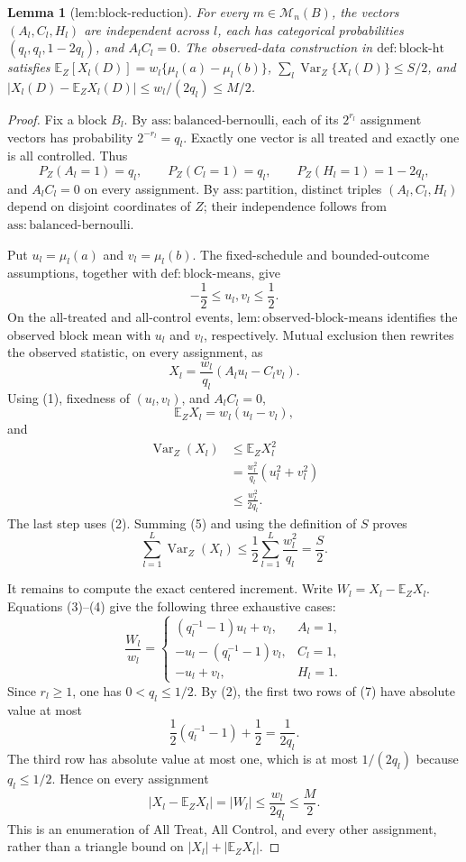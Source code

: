 \documentclass{article}
\newtheorem{lemma}{Lemma}
\begin{document}
\begin{lemma}[lem:block-reduction]\label{lem:block-reduction}
For every \(m\in\mathcal M_n(B)\), the vectors \((A_l,C_l,H_l)\) are independent across \(l\), each has categorical probabilities \((q_l,q_l,1-2q_l)\), and \(A_lC_l=0\). The observed-data construction in \(\mathrm{def{:}block\text{-}ht}\) satisfies \(\mathbb E_Z[X_l(D)]=w_l\{\mu_l(a)-\mu_l(b)\}\), \(\sum_l\operatorname{Var}_Z\{X_l(D)\}\le S/2\), and \(|X_l(D)-\mathbb E_ZX_l(D)|\le w_l/(2q_l)\le M/2\).
\end{lemma}
\begin{proof}
Fix a block \(B_l\). By \(\mathrm{ass{:}balanced\text{-}bernoulli}\), each of its \(2^{r_l}\) assignment vectors has probability \(2^{-r_l}=q_l\). Exactly one vector is all treated and exactly one is all controlled. Thus
\[
 P_Z(A_l=1)=q_l,\qquad P_Z(C_l=1)=q_l,
 \qquad P_Z(H_l=1)=1-2q_l,
\tag{1}
\]
and \(A_lC_l=0\) on every assignment. By \(\mathrm{ass{:}partition}\), distinct triples \((A_l,C_l,H_l)\) depend on disjoint coordinates of \(Z\); their independence follows from \(\mathrm{ass{:}balanced\text{-}bernoulli}\).

Put \(u_l=\mu_l(a)\) and \(v_l=\mu_l(b)\). The fixed-schedule and bounded-outcome assumptions, together with \(\mathrm{def{:}block\text{-}means}\), give
\[
 -\frac12\le u_l,v_l\le\frac12.
\tag{2}
\]
On the all-treated and all-control events, \(\mathrm{lem{:}observed\text{-}block\text{-}means}\) identifies the observed block mean with \(u_l\) and \(v_l\), respectively. Mutual exclusion then rewrites the observed statistic, on every assignment, as
\[
 X_l=\frac{w_l}{q_l}(A_lu_l-C_lv_l).
\tag{3}
\]
Using (1), fixedness of \((u_l,v_l)\), and \(A_lC_l=0\),
\[
 \mathbb E_ZX_l=w_l(u_l-v_l),
\tag{4}
\]
and
\[
\begin{aligned}
 \operatorname{Var}_Z(X_l)
 &\le\mathbb E_ZX_l^2\\
 &=\frac{w_l^2}{q_l}(u_l^2+v_l^2)\\
 &\le\frac{w_l^2}{2q_l}.
\end{aligned}
\tag{5}
\]
The last step uses (2). Summing (5) and using the definition of \(S\) proves
\[
 \sum_{l=1}^L\operatorname{Var}_Z(X_l)
 \le\frac12\sum_{l=1}^L\frac{w_l^2}{q_l}=\frac S2.
\tag{6}
\]

It remains to compute the exact centered increment. Write \(W_l=X_l-\mathbb E_ZX_l\). Equations (3)--(4) give the following three exhaustive cases:
\[
 \frac{W_l}{w_l}=
 \begin{cases}
  (q_l^{-1}-1)u_l+v_l,&A_l=1,\\
  -u_l-(q_l^{-1}-1)v_l,&C_l=1,\\
  -u_l+v_l,&H_l=1.
 \end{cases}
\tag{7}
\]
Since \(r_l\ge1\), one has \(0<q_l\le1/2\). By (2), the first two rows of (7) have absolute value at most
\[
 \frac12(q_l^{-1}-1)+\frac12=\frac1{2q_l}.
\tag{8}
\]
The third row has absolute value at most one, which is at most \(1/(2q_l)\) because \(q_l\le1/2\). Hence on every assignment
\[
 |X_l-\mathbb E_ZX_l|=|W_l|
 \le\frac{w_l}{2q_l}\le\frac M2.
\tag{9}
\]
This is an enumeration of All Treat, All Control, and every other assignment, rather than a triangle bound on \(|X_l|+|\mathbb E_ZX_l|\).


\end{proof}
\end{document}
